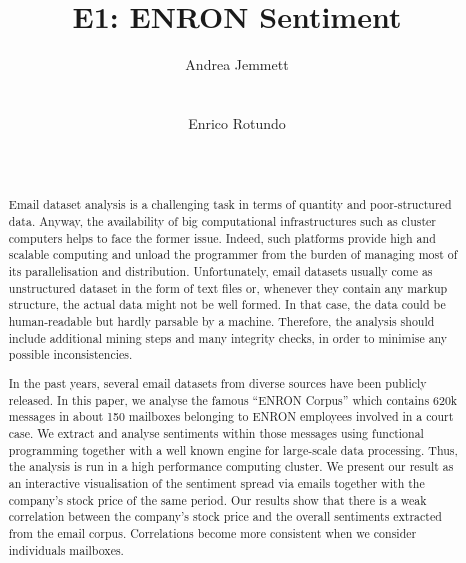\documentclass{vldb}
\begin{document}
\title{E1: ENRON Sentiment}


\author{
\alignauthor
Andrea Jemmett\\
       \\
       \\
\alignauthor
Enrico Rotundo\\
       \\
       \\
}


\maketitle

\begin{abstract}
Email dataset analysis is a challenging task in terms of quantity and poor-structured data.
Anyway, the availability of big computational infrastructures such as cluster computers helps to face the former issue.
Indeed, such platforms provide high and scalable computing and unload the programmer from the burden of managing most of its parallelisation and distribution.
Unfortunately, email datasets usually come as unstructured dataset in the form of text files or, whenever they contain any markup structure, the actual data might not be well formed.
In that case, the data could be human-readable but hardly parsable by a machine.
Therefore, the analysis should include additional mining steps and many integrity checks, in order to minimise any possible inconsistencies.  

In the past years, several email datasets from diverse sources have been publicly released.
In this paper, we analyse the famous ``ENRON Corpus'' which contains 620k messages in about 150 mailboxes belonging to ENRON employees involved in a court case.
We extract and analyse sentiments within those messages using functional programming together with a well known engine for large-scale data processing. 
Thus, the analysis is run in a high performance computing cluster.   
We present our result as an interactive visualisation of the sentiment spread via emails together with the company's stock price of the same period.
Our results show that there is a weak correlation between the company's stock
price and the overall sentiments extracted from the email corpus. Correlations
become more consistent when we consider individuals mailboxes.

\end{abstract}
\end{document}
